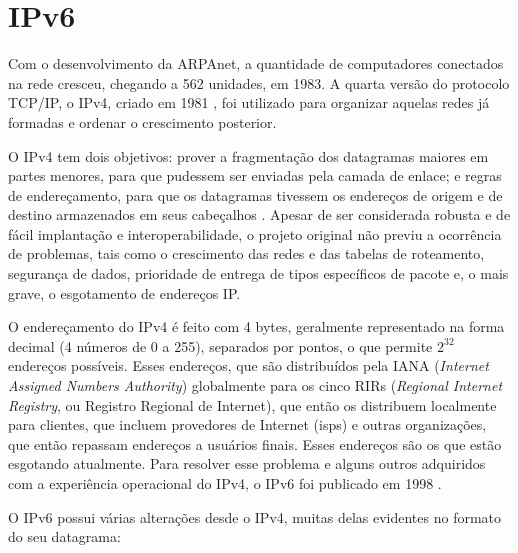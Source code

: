
\section{IPv6}

Com o desenvolvimento da ARPAnet, a quantidade de computadores conectados na rede
cresceu, chegando a 562 unidades, em 1983. A quarta versão do protocolo TCP/IP, o IPv4,
criado em 1981 \cite{site:rfcipv4}, foi utilizado para organizar aquelas redes já
formadas e ordenar o crescimento posterior.

O IPv4 tem dois objetivos: prover a fragmentação dos datagramas maiores em partes
menores, para que pudessem ser enviadas pela camada de enlace; e regras de
endereçamento, para que os datagramas tivessem os endereços de origem e de destino
armazenados em seus cabeçalhos \cite{site:nicipv4}. Apesar de ser considerada robusta e
de fácil implantação e interoperabilidade, o projeto original não previu a ocorrência
de problemas, tais como o crescimento das redes e das tabelas de roteamento, segurança
de dados, prioridade de entrega de tipos específicos de pacote e, o mais grave, o
esgotamento de endereços IP.

O endereçamento do IPv4 é feito com 4 bytes, geralmente representado na forma decimal
(4 números de 0 a 255), separados por pontos, o que permite $2^32$ endereços possíveis.
Esses endereços, que são distribuídos pela IANA
(\emph{Internet Assigned Numbers Authority}) globalmente para os cinco RIRs
(\emph{Regional Internet Registry}, ou Registro Regional de Internet), que então os
distribuem localmente para clientes, que incluem provedores de Internet (\glspl{isp}) e
outras organizações, que então repassam endereços a usuários finais. Esses endereços
são os que estão esgotando atualmente. Para resolver esse problema e alguns outros
adquiridos com a experiência operacional do IPv4, o IPv6 foi publicado em 1998
\cite{site:rfcipv6}.

O IPv6 possui várias alterações desde o IPv4, muitas delas evidentes no formato do seu
datagrama:

